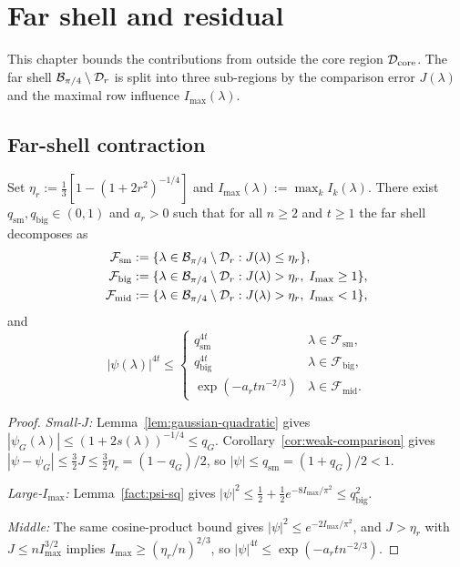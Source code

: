 \chapter{Far shell and residual}\label{chap:residual}

This chapter bounds the contributions from outside the core region
$\mathcal{D}_\mathrm{core}$. The far shell $\mathcal{B}_{\pi/4}\setminus\mathcal{D}_r$ is split into
three sub-regions by the comparison error $J(\lambda)$ and the maximal
row influence $I_{\max}(\lambda)$.

\section{Far-shell contraction}

\begin{proposition}\label{prop:far-shell}
\leanok
{}
Set $\eta_r:=\frac{1}{3}[1-(1+2r^2)^{-1/4}]$ and
$I_{\max}(\lambda):=\max_k I_k(\lambda)$.
There exist $q_{\mathrm{sm}},q_{\mathrm{big}}\in(0,1)$ and $a_r>0$
such that for all $n\ge 2$ and $t\ge 1$ the far shell decomposes as
\[
  \begin{aligned}
  \mathcal F_{\mathrm{sm}}
    &:=\{\lambda\in\mathcal{B}_{\pi/4}\setminus\mathcal{D}_r:J(\lambda)\le \eta_r\},\\
  \mathcal F_{\mathrm{big}}
    &:=\{\lambda\in\mathcal{B}_{\pi/4}\setminus\mathcal{D}_r:J(\lambda)>\eta_r,\;I_{\max}\ge 1\},\\
  \mathcal F_{\mathrm{mid}}
    &:=\{\lambda\in\mathcal{B}_{\pi/4}\setminus\mathcal{D}_r:J(\lambda)>\eta_r,\;I_{\max}<1\},
  \end{aligned}
\]
and
\[
  |\psi(\lambda)|^{4t}\le
  \begin{cases}
    q_{\mathrm{sm}}^{4t} & \lambda\in\mathcal F_{\mathrm{sm}},\\
    q_{\mathrm{big}}^{4t} & \lambda\in\mathcal F_{\mathrm{big}},\\
    \exp(-a_r t n^{-2/3}) & \lambda\in\mathcal F_{\mathrm{mid}}.
  \end{cases}
\]
\end{proposition}

\begin{proof}\leanok
{}
\emph{Small-$J$:}
Lemma~\ref{lem:gaussian-quadratic} gives
$|\psi_G(\lambda)|\le(1+2s(\lambda))^{-1/4}\le q_G$.
Corollary~\ref{cor:weak-comparison} gives
$|\psi-\psi_G|\le\frac32 J\le\frac32\eta_r=(1-q_G)/2$,
so $|\psi|\le q_{\mathrm{sm}}=(1+q_G)/2<1$.

\emph{Large-$I_{\max}$:}
Lemma~\ref{fact:psi-sq} gives
$|\psi|^2\le\frac12+\frac12 e^{-8I_{\max}/\pi^2}\le q_{\mathrm{big}}^2$.

\emph{Middle:}
The same cosine-product bound gives
$|\psi|^2\le e^{-2I_{\max}/\pi^2}$, and
$J>  \eta_r$ with $J\le nI_{\max}^{3/2}$ implies
$I_{\max}\ge(\eta_r/n)^{2/3}$, so
$|\psi|^{4t}\le\exp(-a_r tn^{-2/3})$.
\end{proof}

